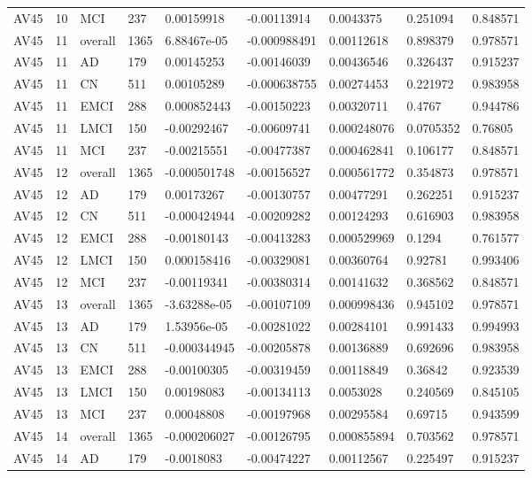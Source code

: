 \begin{landscape}
\begin{longtable}{lllllllll}
AV45 & 10 & MCI & 237 & 0.00159918 & -0.00113914 & 0.0043375 & 0.251094 & 0.848571 \\
AV45 & 11 & overall & 1365 & 6.88467e-05 & -0.000988491 & 0.00112618 & 0.898379 & 0.978571 \\
AV45 & 11 & AD & 179 & 0.00145253 & -0.00146039 & 0.00436546 & 0.326437 & 0.915237 \\
AV45 & 11 & CN & 511 & 0.00105289 & -0.000638755 & 0.00274453 & 0.221972 & 0.983958 \\
AV45 & 11 & EMCI & 288 & 0.000852443 & -0.00150223 & 0.00320711 & 0.4767 & 0.944786 \\
AV45 & 11 & LMCI & 150 & -0.00292467 & -0.00609741 & 0.000248076 & 0.0705352 & 0.76805 \\
AV45 & 11 & MCI & 237 & -0.00215551 & -0.00477387 & 0.000462841 & 0.106177 & 0.848571 \\
AV45 & 12 & overall & 1365 & -0.000501748 & -0.00156527 & 0.000561772 & 0.354873 & 0.978571 \\
AV45 & 12 & AD & 179 & 0.00173267 & -0.00130757 & 0.00477291 & 0.262251 & 0.915237 \\
AV45 & 12 & CN & 511 & -0.000424944 & -0.00209282 & 0.00124293 & 0.616903 & 0.983958 \\
AV45 & 12 & EMCI & 288 & -0.00180143 & -0.00413283 & 0.000529969 & 0.1294 & 0.761577 \\
AV45 & 12 & LMCI & 150 & 0.000158416 & -0.00329081 & 0.00360764 & 0.92781 & 0.993406 \\
AV45 & 12 & MCI & 237 & -0.00119341 & -0.00380314 & 0.00141632 & 0.368562 & 0.848571 \\
AV45 & 13 & overall & 1365 & -3.63288e-05 & -0.00107109 & 0.000998436 & 0.945102 & 0.978571 \\
AV45 & 13 & AD & 179 & 1.53956e-05 & -0.00281022 & 0.00284101 & 0.991433 & 0.994993 \\
AV45 & 13 & CN & 511 & -0.000344945 & -0.00205878 & 0.00136889 & 0.692696 & 0.983958 \\
AV45 & 13 & EMCI & 288 & -0.00100305 & -0.00319459 & 0.00118849 & 0.36842 & 0.923539 \\
AV45 & 13 & LMCI & 150 & 0.00198083 & -0.00134113 & 0.0053028 & 0.240569 & 0.845105 \\
AV45 & 13 & MCI & 237 & 0.00048808 & -0.00197968 & 0.00295584 & 0.69715 & 0.943599 \\
AV45 & 14 & overall & 1365 & -0.000206027 & -0.00126795 & 0.000855894 & 0.703562 & 0.978571 \\
AV45 & 14 & AD & 179 & -0.0018083 & -0.00474227 & 0.00112567 & 0.225497 & 0.915237 \\

\end{longtable}
\end{landscape}
